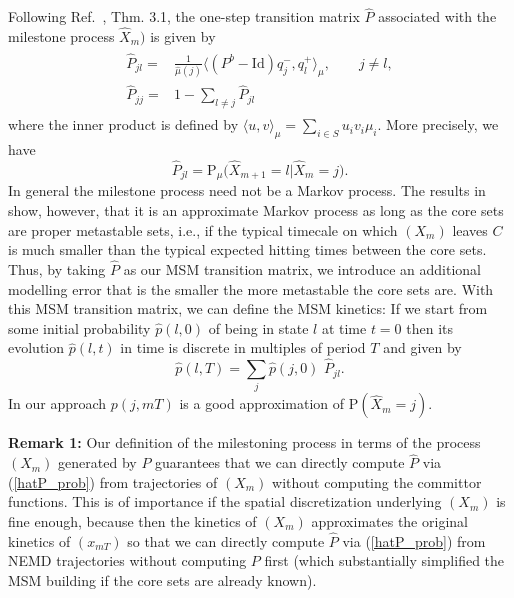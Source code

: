 \documentclass[aps, pre, preprint,unsortedaddress,a4paper,onecolumn]{revtex4}
\newcommand{\recheck}[1]{{\color{red} #1}}
\newcommand{\vect}[1]{#1}
\newcommand{\fwd}[0]{+}
\newcommand{\bwd}[0]{-}
\newcommand{\id}{\mathrm{Id}}
\newcommand{\prob}{\textrm{P}}
\begin{document}
Following
Ref.~\cite{djurdjevac2010markov}, Thm. 3.1, the one-step transition
matrix $\hat{\vect P}$ associated with the milestone process $\hat{X}_m)$ is given by
  \begin{align}
    \label{eq:msm-tmatrix-00}
    \begin{split}      
    \hat{\vect P}_{jl}
    = &
    \frac{1}{\hat{\mu}(j)}
    \langle (\vect P^b - \id) q^\bwd_j,q^\fwd_l \rangle_\mu,\qquad j\not= l, \\    %
    \hat{\vect P}_{jj}
    =&
    1-\sum_{l\not=j} \hat{\vect P}_{jl}
    \end{split}
  \end{align}
where the inner product is defined by
$\langle u,v \rangle_\mu=\sum_{i\in S} u_i v_i \mu_i$. More precisely, we have
\begin{equation}\label{hatP_prob}
\hat{\vect P}_{jl}=\prob_\mu\Big(\hat{X}_{m+1}=l\vert \hat{X}_m=j\Big).
\end{equation}
In general the milestone process need not be a Markov process. The results in \cite{A1-31,sarich2014utilizing} show, however, that it is an approximate Markov process as long as the core sets are proper metastable sets, i.e., if the typical timecale on which $(X_m)$ leaves $C$ is much smaller than the typical expected hitting times between the core sets.
Thus, by taking $\hat{P}$ as our MSM transition matrix, we introduce an additional modelling error that is the smaller the more metastable the core sets are.
With this MSM transition matrix, we can define the MSM kinetics:
If we start from some initial probability $\hat{p}(l,0)$ of being in state $l$ at time $t=0$ then its evolution $\hat{p}(l,t)$ in time is discrete in multiples of period $T$ and given by
\recheck{
\begin{equation}\label{eq:num-29}
\hat{p}(l,T)=\sum_j \hat{p}(j,0)\,\,\hat{\vect P}_{jl}.
\end{equation}}
In our approach $p(j,mT)$ is a good approximation of $\prob(\hat{X}_m=j)$.

\textbf{Remark 1:} Our definition of the milestoning process in terms of the process $(X_m)$ generated by $P$ guarantees that we can directly compute $\hat{P}$ via (\ref{hatP_prob})  from trajectories of $(X_m)$ without computing the committor functions. 
This is of importance if the spatial discretization underlying $(X_m)$ is fine enough, because then the kinetics of $(X_m)$
approximates the original kinetics of $(x_{mT})$ so that we can directly compute   $\hat{P}$ via (\ref{hatP_prob})  from NEMD trajectories without computing $P$ first (which substantially simplified the MSM building if the core sets are already known).
\end{document}
